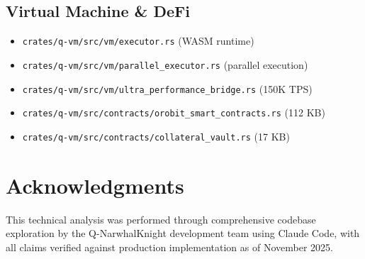 \documentclass[11pt,a4paper]{article}
\begin{document}
\subsection{Virtual Machine \& DeFi}
\begin{itemize}
    \item \texttt{crates/q-vm/src/vm/executor.rs} (WASM runtime)
    \item \texttt{crates/q-vm/src/vm/parallel\_executor.rs} (parallel execution)
    \item \texttt{crates/q-vm/src/vm/ultra\_performance\_bridge.rs} (150K TPS)
    \item \texttt{crates/q-vm/src/contracts/orobit\_smart\_contracts.rs} (112 KB)
    \item \texttt{crates/q-vm/src/contracts/collateral\_vault.rs} (17 KB)
\end{itemize}

\section{Acknowledgments}

This technical analysis was performed through comprehensive codebase exploration by the Q-NarwhalKnight development team using Claude Code, with all claims verified against production implementation as of November 2025.
\end{document}
